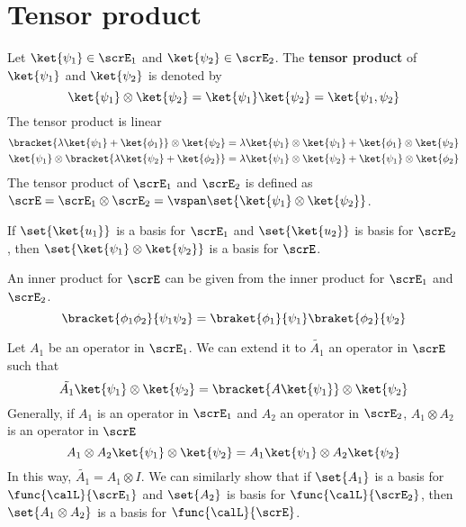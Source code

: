 \section{Tensor product}
Let \(\ket{\psi_1} \in \scrE_1\) and \(\ket{\psi_2} \in \scrE_2\). The \textbf{tensor product} of \(\ket{\psi_1}\) and \(\ket{\psi_2}\) is denoted by 
\begin{equation*}
    \ket{\psi_1} \otimes \ket{\psi_2} = \ket{\psi_1} \ket{\psi_2} = \ket{\psi_1, \psi_2}
\end{equation*}
The tensor product is linear
\begin{align*}
    \bracket{\lambda \ket{\psi_1} + \ket{\phi_1}} \otimes \ket{\psi_2} &= \lambda \ket{\psi_1} \otimes \ket{\psi_1} + \ket{\phi_1} \otimes \ket{\psi_2}\\
    \ket{\psi_1} \otimes \bracket{\lambda \ket{\psi_2} + \ket{\phi_2}} &= \lambda\ket{\psi_1} \otimes \ket{\psi_2} + \ket{\psi_1} \otimes \ket{\phi_2}\\
\end{align*}
The tensor product of \(\scrE_1\) and \(\scrE_2\) is defined as \(\scrE = \scrE_1 \otimes \scrE_2 = \vspan \set{\ket{\psi_1} \otimes \ket{\psi_2}}\).

\begin{proposition}
    If \(\set{\ket{u_1}}\) is a basis for \(\scrE_1\) and \(\set{\ket{u_2}}\) is basis for \(\scrE_2\), then \(\set{\ket{\psi_1} \otimes \ket{\psi_2}}\) is a basis for \(\scrE\).
\end{proposition}
\begin{definition}
    An inner product for \(\scrE\) can be given from the inner product for \(\scrE_1\) and \(\scrE_2\).
    \begin{equation*}
        \bracket{\phi_1 \phi_2}{\psi_1 \psi_2} = \braket{\phi_1}{\psi_1} \braket{\phi_2}{\psi_2}
    \end{equation*}
\end{definition}
Let \(A_1\) be an operator in \(\scrE_1\). We can extend it to \(\tilde{A_1}\) an operator in \(\scrE\) such that 
\begin{equation*}
    \tilde{A_1} \ket{\psi_1} \otimes \ket{\psi_2} = \bracket{A \ket{\psi_1}} \otimes \ket{\psi_2}
\end{equation*}
Generally, if \(A_1\) is an operator in \(\scrE_1\) and \(A_2\) an operator in \(\scrE_2\), \(A_1 \otimes A_2\) is an operator in \(\scrE\) 
\begin{equation*}
    A_1 \otimes A_2 \ket{\psi_1} \otimes \ket{\psi_2} = A_1 \ket{\psi_1} \otimes A_2 \ket{\psi_2}
\end{equation*}
In this way, \(\tilde{A_1} = A_1 \otimes I\).  We can similarly show that if \(\set{A_1}\) is a basis for \(\func{\calL}{\scrE_1}\) and \(\set{A_2}\) is basis for \(\func{\calL}{\scrE_2}\), then \(\set{A_1 \otimes A_2}\) is a basis for \(\func{\calL}{\scrE}\).

